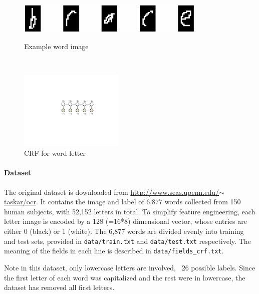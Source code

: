 \documentclass[11pt]{report}
\begin{document}
	
	\begin{figure}[t!]
		\begin{minipage}[b]{0.62\textwidth}
			\centering
			\vspace{-0.6em}
			\includegraphics[width=9cm]{brace.jpg}
			\vspace{0.6em}
			\caption{Example word image}\label{fig:brace}
		\end{minipage}
		~~~
		\begin{minipage}[b]{0.33\textwidth}
			\centering
			\includegraphics[width=5cm]{crf}
			\caption{CRF for word-letter}\label{fig:CRF_model}
		\end{minipage}
	\end{figure}
	
	
	
	\paragraph{Dataset}
	The original dataset is downloaded from \href{http://www.seas.upenn.edu/~taskar/ocr/}{http://www.seas.upenn.edu/$\sim$taskar/ocr}.
	It contains the image and label of 6,877 words collected from 150 human subjects,
	with 52,152 letters in total.
	To simplify feature engineering, each letter image is encoded by a 128 (=16*8) dimensional vector,
	whose entries are either 0 (black) or 1 (white).
	The 6,877 words are divided evenly into training and test sets,
	provided in \verb#data/train.txt# and \verb#data/test.txt# respectively.
	The meaning of the fields in each line is described in \verb#data/fields_crf.txt#.
	
	
	Note in this dataset, only lowercase letters are involved, \ie\ 26 possible labels.
	Since the first letter of each word was capitalized and the rest were in lowercase,
	the dataset has removed all first letters.
	
\end{document}
